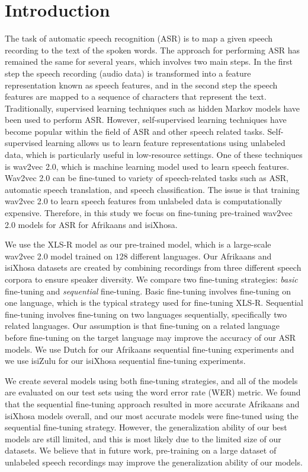 \graphicspath{{introduction/fig/}}

\chapter{Introduction} \label{chap:introduction}
The task of automatic speech recognition (ASR) is to map a given speech recording to the text of the spoken words.
The approach for performing ASR has remained the same for several years, which involves two main steps.
In the first step the speech recording (audio data) is transformed into a feature representation known as speech features,
and in the second step the speech features are mapped to a sequence of characters that represent the text.
Traditionally, supervised learning techniques such as hidden Markov models have been used to perform ASR.
However, self-supervised learning techniques have become popular within the field of ASR and other speech related tasks.
Self-supervised learning allows us to learn feature representations using unlabeled data, which is particularly useful in low-resource settings.
One of these techniques is wav2vec 2.0, which is machine learning model used to learn speech features.
Wav2vec 2.0 can be fine-tuned to variety of speech-related tasks such as ASR, automatic speech translation, and speech classification.
The issue is that training wav2vec 2.0 to learn speech features from unlabeled data is computationally expensive. 
Therefore, in this study we focus on fine-tuning pre-trained wav2vec 2.0 models for ASR for Afrikaans and isiXhosa. 

We use the XLS-R model as our pre-trained model, which is a large-scale wav2vec 2.0 model trained on $128$ different languages.
Our Afrikaans and isiXhosa datasets are created by combining recordings from three different speech corpora to ensure speaker diversity.
We compare two fine-tuning strategies: \emph{basic} fine-tuning and \emph{sequential} fine-tuning.
Basic fine-tuning involves fine-tuning on one language, which is the typical strategy used for fine-tuning XLS-R.
Sequential fine-tuning involves fine-tuning on two languages sequentially, specifically two related languages.
Our assumption is that fine-tuning on a related language before fine-tuning on the target language may improve the accuracy of our ASR models.
We use Dutch for our Afrikaans sequential fine-tuning experiments and we use isiZulu for our isiXhosa sequential fine-tuning experiments.

We create several models using both fine-tuning strategies, and all of the models are evaluated on our test sets using the word error rate (WER) metric.
We found that the sequential fine-tuning approach resulted in more accurate Afrikaans and isiXhosa models overall, 
and our most accurate models were fine-tuned using the sequential fine-tuning strategy.
However, the generalization ability of our best models are still limited, and this is most likely due to the limited size of our datasets.
We believe that in future work, pre-training on a large dataset of unlabeled speech recordings may improve the generalization ability of our models.

